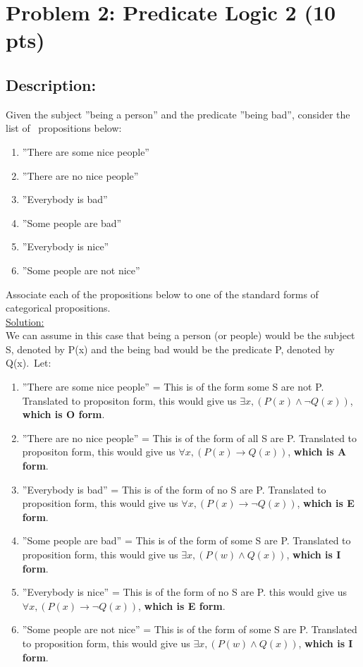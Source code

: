 \section{Problem 2: Predicate Logic 2 (10 pts)}

\subsection{Description:}

\noindent Given the subject {''being a person''} and the predicate {''being bad''}, consider the list of \ propositions below:
\begin{enumerate}
  \item {''There are some nice people''}
  \item {''There are no nice people''}
  \item {''Everybody is bad''}
  \item {''Some people are bad''}
  \item {''Everybody is nice''}
  \item {''Some people are not nice''}
  
\end{enumerate}

\noindent Associate each of the propositions below to one of the standard forms of categorical propositions.\\

\noindent \underline{Solution:}\\
We can assume in this case that being a person (or people) would be the subject S, denoted by P(x) and the being bad would be the predicate P, denoted by Q(x).\
Let:\

\begin{enumerate}
  \item {''There are some nice people''} = This is of the form some S are not P. Translated to propositon form, this would give us $\exists x, (P(x) \wedge \neg Q(x))$, \textbf{which is O form}. 
  \item {''There are no nice people''} = This is of the form of all S are P. Translated to propositon form, this would give us $\forall x, (P(x) \to Q(x))$, \textbf{which is A form}.
  \item {''Everybody is bad''} = This is of the form of no S are P. Translated to proposition form, this would give us $\forall x, (P(x) \to \neg Q(x))$, \textbf{which is E form}.
  \item {''Some people are bad''} = This is of the form of some S are P. Translated to proposition form, this would give us $\exists x, (P(w) \wedge Q(x))$, \textbf{which is I form}.
  \item {''Everybody is nice''} = This is of the form of no S are P. this would give us $\forall x, (P(x) \to \neg Q(x))$, \textbf{which is E form}.
  \item {''Some people are not nice''} = This is of the form of some S are P. Translated to proposition form, this would give us $\exists x, (P(w) \wedge Q(x))$, \textbf{which is I form}.
\end{enumerate}

